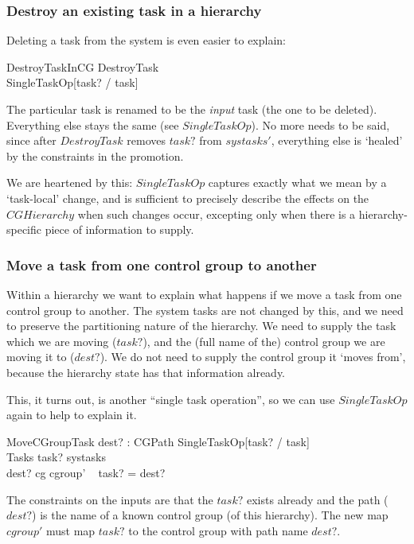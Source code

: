 \documentclass[a4paper,twoside,12pt]{article}
\begin{document}
\subsubsection{Destroy an existing task in a hierarchy}

Deleting a task from the system is even easier to explain:

\begin{schema}{DestroyTaskInCG}
DestroyTask \\
SingleTaskOp[task? / task]
\end{schema}
The particular task is renamed to be the \emph{input} task (the one to be deleted).
Everything else stays the same (see $SingleTaskOp$).
No more needs to be said, since after $DestroyTask$ removes $task?$ from $systasks'$,
everything else is `healed' by the constraints in the promotion.

We are heartened by this: $SingleTaskOp$ captures exactly what we mean by a `task-local' change,
and is sufficient to precisely describe the effects on the $CGHierarchy$ when such changes occur, excepting only
when there is
a hierarchy-specific piece of information to supply.

\subsubsection{Move a task from one control group to another}

Within a hierarchy we want to explain what happens if we move a task from one control group to another.
The system tasks are not changed by this, and we need to preserve the partitioning nature of the hierarchy.
We need to supply the task which we are moving ($task?$),
and the (full name of the) control group we are moving it to ($dest?$).
We do not need to supply the control group it `moves from', because the hierarchy state has that information already.

This, it turns out, is another ``single task operation'', so we can use $SingleTaskOp$ again to help to explain it.

\begin{schema}{MoveCGroupTask}
dest? : CGPath
\also
SingleTaskOp[task? / task] \\
\Xi Tasks
\where
task? \in systasks \\
dest? \in \dom cg
\also
cgroup' ~ task?  = dest?
\end{schema}
The constraints on the inputs are that the $task?$ exists already and
the path ($dest?$) is the name of a known control group (of this hierarchy).
The new map $cgroup'$ must map $task?$ to the control group with path name $dest?$.
\end{document}

